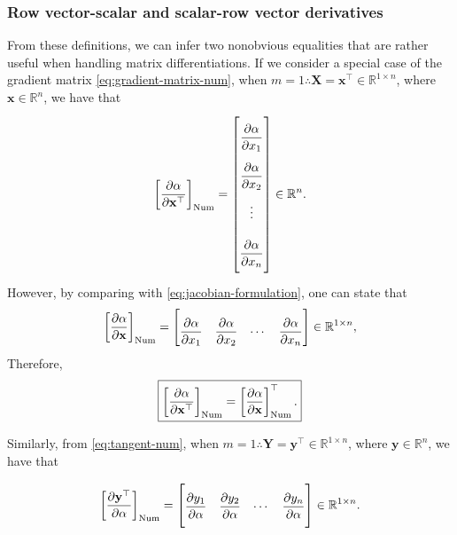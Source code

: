 \subsubsection{Row vector-scalar and scalar-row vector derivatives}

From these definitions, we can infer two nonobvious equalities that are rather useful when handling matrix differentiations. If we consider a special case of the gradient matrix \eqref{eq:gradient-matrix-num}, when $m=1 \therefore \mathbf{X} = \mathbf{x}^\top \in \mathbb{R}^{1\times n}$, where $\mathbf{x} \in \mathbb{R}^n$, we have that
\begin{align}
    \label{eq:hidden-num-1}
    \left[\dfrac{\partial \alpha}{\partial \mathbf{x}^\top}\right]_{\textnormal{Num}} = \renewcommand{\arraystretch}{2.6}\begin{bmatrix}
        \dfrac{\partial \alpha}{\partial x_{1}} \\
        \dfrac{\partial \alpha}{\partial x_{2}} \\
        \vdots \\
        \dfrac{\partial \alpha}{\partial x_{n}}\vspace{1.3ex}
    \end{bmatrix} \in \mathbb{R}^{n}.
\end{align}
However, by comparing with \eqref{eq:jacobian-formulation}, one can state that
\begin{align}
    \left[\dfrac{\partial \alpha}{\partial \mathbf{x}}\right]_{\textnormal{Num}} = \begin{bmatrix} \dfrac{\partial \alpha}{\partial x_{1}} & \dfrac{\partial \alpha}{\partial x_{2}} & \cdots & \dfrac{\partial \alpha}{\partial x_{n}} \end{bmatrix} \in \mathbb{R}^{1 \times n},
\end{align}
Therefore,
\begin{align}
    \label{eq:hidden-num}
    \boxed{\left[\dfrac{\partial \alpha}{\partial \mathbf{x}^\top}\right]_{\textnormal{Num}} = \left[\dfrac{\partial \alpha}{\partial \mathbf{x}}\right]_{\textnormal{Num}}^\top.}
\end{align}

Similarly, from \eqref{eq:tangent-num}, when $m=1 \therefore \mathbf{Y} = \mathbf{y}^\top \in \mathbb{R}^{1\times n}$, where $\mathbf{y} \in \mathbb{R}^n$, we have that

\begin{align}
    \left[\dfrac{\partial \mathbf{y}^\top}{\partial \alpha}\right]_{\textnormal{Num}} = \renewcommand{\arraystretch}{2.6}\begin{bmatrix}
        \dfrac{\partial y_{1}}{\partial \alpha} &
        \dfrac{\partial y_{2}}{\partial \alpha} &
        \cdots &
        \dfrac{\partial y_{n}}{\partial \alpha}\vspace{1.3ex}
    \end{bmatrix} \in \mathbb{R}^{1 \times n}.
\end{align}


